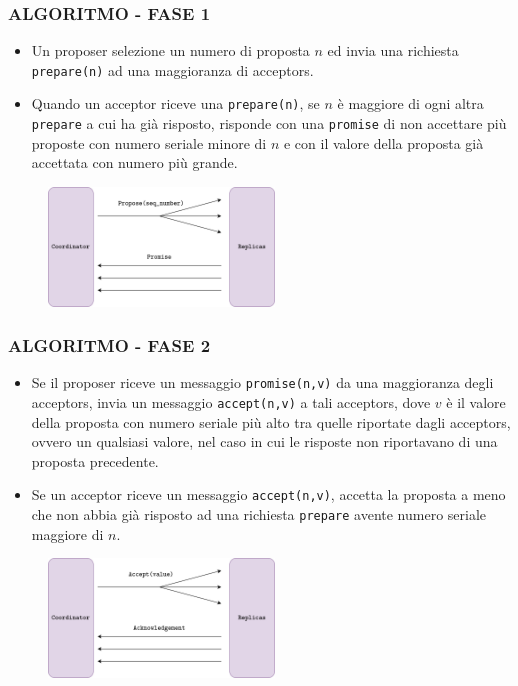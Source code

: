 \subsubsection{ALGORITMO - FASE 1}
\begin{itemize}
    \item Un proposer selezione un numero di proposta $n$ ed invia una richiesta \texttt{prepare(n)} ad una maggioranza di acceptors.
    \item Quando un acceptor riceve una \texttt{prepare(n)}, se $n$ è maggiore di ogni altra \texttt{prepare} a cui ha già risposto, risponde con una \texttt{promise} di non accettare più proposte con numero seriale minore di $n$ e con il valore della proposta già accettata con numero più grande.
\end{itemize}

\begin{figure}[ht]
    \centering
    \includegraphics[width=6cm]{./Images/cap2/2.14.png}
\end{figure}

\subsubsection{ALGORITMO - FASE 2}
\begin{itemize}
    \item Se il proposer riceve un messaggio \texttt{promise(n,v)} da una maggioranza degli acceptors, invia un messaggio \texttt{accept(n,v)} a tali acceptors, dove $v$ è il valore della proposta con numero seriale più alto tra quelle riportate dagli acceptors, ovvero un qualsiasi valore, nel caso in cui le risposte non riportavano di una proposta precedente.
    \item Se un acceptor riceve un messaggio \texttt{accept(n,v)}, accetta la proposta a meno che non abbia già risposto ad una richiesta \texttt{prepare} avente numero seriale maggiore di $n$.
\end{itemize}

\begin{figure}[ht]
    \centering
    \includegraphics[width=6cm]{./Images/cap2/2.15.png}
\end{figure}
